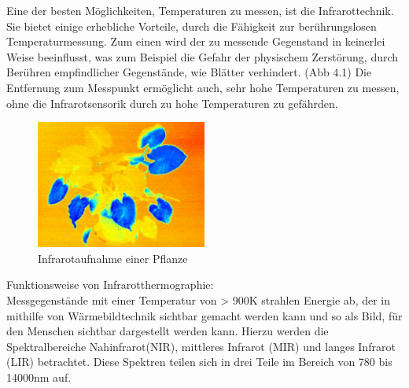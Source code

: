 Eine der besten Möglichkeiten, Temperaturen zu messen, ist die Infrarottechnik.
Sie bietet einige erhebliche Vorteile, durch die Fähigkeit zur berührungslosen
Temperaturmessung. Zum einen wird der zu messende Gegenstand in keinerlei Weise
beeinflusst, was zum Beispiel die Gefahr der physischem Zerstörung, durch
Berühren empfindlicher Gegenstände, wie Blätter verhindert. (Abb 4.1) Die
Entfernung zum Messpunkt ermöglicht auch, sehr hohe Temperaturen zu messen,
ohne die Infrarotsensorik durch zu hohe Temperaturen zu gefährden.

\begin{figure}[ht]
    \centering
    \includegraphics[width=0.5\textwidth]{bilder/infrarot_pflanze.jpg}
    \caption[Infrarotaufnahme einer Pflanze]{Infrarotaufnahme einer Pflanze}
    \label{fig:Infrarotaufnahme Pflanze}
\end{figure}

Funktionsweise von Infrarotthermographie: \\
Messgegenstände mit einer Temperatur von > 900K strahlen Energie ab, der in mithilfe von Wärmebildtechnik sichtbar gemacht werden kann und so als Bild, für den Menschen sichtbar dargestellt werden kann.
Hierzu werden die Spektralbereiche Nahinfrarot(NIR), mittleres Infrarot (MIR) und langes Infrarot (LIR) betrachtet. 
Diese Spektren teilen sich in drei Teile im Bereich von 780 bis 14000nm auf. \cite{schuster2004infrarotthermographie}
